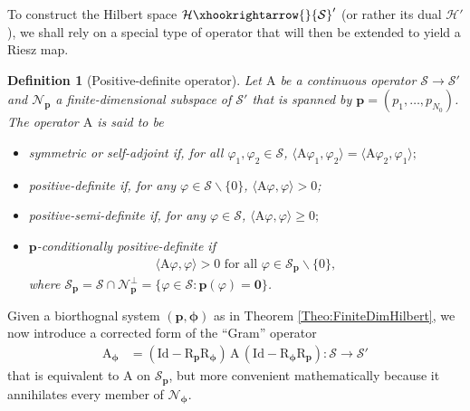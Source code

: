 \documentclass[11pt, english,english]{article}
\newtheorem{definition}{Definition}
\def\V#1{{\boldsymbol{#1}}}         %
\def\Spc#1{{\mathcal{#1}}}  %
\def\Op#1{{\mathrm{#1}}}  %
\def\Identity{\mathrm{Id}} %
\newcommand{\embedC}{\xhookrightarrow{}}
\renewcommand{\[}{\begin{equation}}
\renewcommand{\]}[1]{\label{eq:#1}\end{equation}}
\begin{document}
To construct the Hilbert space $ \Spc H \embedC \Spc S'$ (or rather its dual $\Spc H'$), we shall rely
on a special type of operator that will then be extended to yield a Riesz map.
\begin{definition}[Positive-definite operator]
\label{Def:CondPositiveDef2}
Let  $\Op A$ be a continuous operator $\Spc S \to \Spc S'$ and $\Spc N_{\V p}$ a finite-dimensional subspace of $\Spc S'$ that is spanned by
$\V p=(p_1,\dots,p_{N_0})$.
The operator $\Op A$ is said to be
\begin{itemize}
\item symmetric or self-adjoint if, for all $\varphi_1,\varphi_2 \in \Spc S$,
$
\langle \Op A \varphi_1,\varphi_2\rangle=\langle \Op A \varphi_2,\varphi_1\rangle;
$
\item positive-definite if, for any  $\varphi \in \Spc S\backslash\{0\}
$,
$
\langle \Op A \varphi,\varphi\rangle > 0$;

\item positive-semi-definite if, for any  $\varphi \in \Spc S$,
$
\langle \Op A \varphi,\varphi\rangle \ge 0;
$\item $\V p$-conditionally positive-definite if
\begin{align}
\label{Eq:PositiveDefinite}
\langle \Op A \varphi,\varphi\rangle > 0
\mbox{ for all }\varphi \in  \Spc S_{\V p} \backslash\{0\},
\end{align}
where $\Spc S_{\V p}=\Spc S \cap \Spc N_{\V p}^\perp=\{\varphi \in \Spc S: \V p(\varphi)=\V 0\}$. 
\end{itemize}
\end{definition}
Given a biorthognal system $(\V p,\V \phi)$ as in Theorem \ref{Theo:FiniteDimHilbert}, we now introduce a corrected form of the ``Gram'' operator 
\begin{align}
\label{Eq:Apadmis}
\Op A_{\V \phi}&=(\Identity-\Op R_{\V p}\Op R_{\V \phi})\,\Op A\,(\Identity-\Op R_{\V \phi}\Op R_{\V p}): \Spc S \to \Spc S'
\end{align}
that is equivalent to $\Op A$ on $\Spc S_{\V p}$, but more convenient mathematically because
it annihilates every member of $\Spc N_{\V \phi}$.
\end{document}
